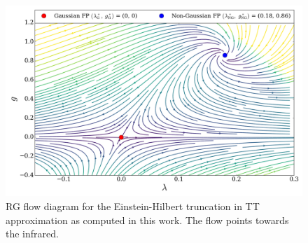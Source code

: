 \begin{figure}[t]
\centering
	\includegraphics[width=\textwidth]{figs/Plots/EH_NoMatter}
	\caption[RG flow diagram for the Einstein-Hilbert truncation in TT approximation]{RG flow diagram  for the Einstein-Hilbert truncation in TT approximation as computed in this work. The flow points towards the infrared.}\end{figure}

